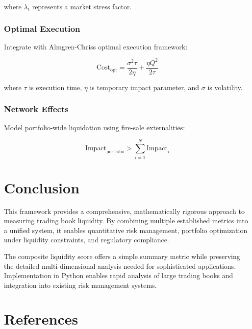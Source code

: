 \documentclass[11pt,a4paper]{article}
\begin{document}
where $\lambda_t$ represents a market stress factor.

\subsubsection{Optimal Execution}

Integrate with Almgren-Chriss optimal execution framework:

\begin{equation}
\text{Cost}_{\text{opt}} = \frac{\sigma^2 \tau}{2\eta} + \frac{\eta Q^2}{2\tau}
\end{equation}

where $\tau$ is execution time, $\eta$ is temporary impact parameter, and $\sigma$ is volatility.

\subsubsection{Network Effects}

Model portfolio-wide liquidation using fire-sale externalities:

\begin{equation}
\text{Impact}_{\text{portfolio}} > \sum_{i=1}^{N} \text{Impact}_i
\end{equation}

\section{Conclusion}

This framework provides a comprehensive, mathematically rigorous approach to measuring trading book liquidity. By combining multiple established metrics into a unified system, it enables quantitative risk management, portfolio optimization under liquidity constraints, and regulatory compliance.

The composite liquidity score offers a simple summary metric while preserving the detailed multi-dimensional analysis needed for sophisticated applications. Implementation in Python enables rapid analysis of large trading books and integration into existing risk management systems.

\section{References}
\end{document}
